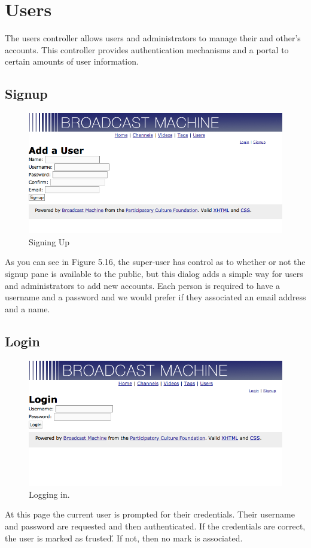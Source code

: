 \documentclass[a4paper,12pt]{report}
\begin{document}
\section{Users}
The users controller allows users and administrators to manage their and other's accounts.
This controller provides authentication mechanisms and a portal to certain amounts of user information.

\subsection{Signup}
\begin{figure}[htp]
\begin{center}
\includegraphics[width=150mm]{./images/usersignup.png}
\end{center}
\caption{Signing Up}
\end{figure}
As you can see in Figure 5.16, the super-user has control as to whether or not the signup pane is available to the public, but this dialog adds a simple way for users and administrators to add new accounts.
Each person is required to have a username and a password and we would prefer if they associated an email address and a name.

\subsection{Login}
\begin{figure}[htp]
\begin{center}
\includegraphics[width=150mm]{./images/userlogin.png}
\end{center}
\caption{Logging in.}
\end{figure}
At this page the current user is prompted for their credentials.
Their username and password are requested and then authenticated.
If the credentials are correct, the user is marked as \'trusted\'.
If not, then no mark is associated.
\end{document}

